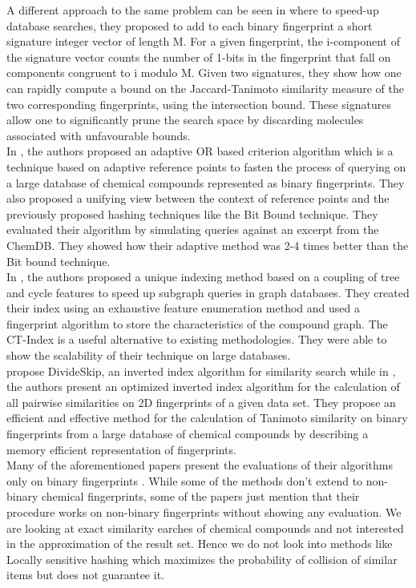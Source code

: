 A different approach to the same problem can be seen in \citet*{nasr2010hashing} where to speed-up database searches, they proposed to add to each binary fingerprint a short signature integer vector of length M. For a given fingerprint, the i-component of the signature vector counts the number of 1-bits in the fingerprint that fall on components congruent to i modulo M. Given two signatures, they show how one can rapidly compute a bound on the Jaccard-Tanimoto similarity measure of the two corresponding fingerprints, using the intersection bound. These signatures allow one to significantly prune the search space by discarding molecules associated with unfavourable bounds. \\

In \citet*{napolitano2014adaptive}, the authors proposed an adaptive OR based criterion algorithm which is a technique based on adaptive reference points to fasten the process of querying on a large database of chemical compounds represented as binary fingerprints. They also proposed a unifying view between the
context of reference points and the previously proposed hashing techniques like the Bit Bound technique. They evaluated their algorithm by simulating queries against an excerpt from the ChemDB. They showed how their adaptive method was 2-4 times better than the Bit bound technique.  \\

In \citet*{klein2011ct}, the authors proposed a unique indexing method based on a coupling of tree and cycle features to speed up subgraph queries in graph databases. They created their index using an exhaustive feature enumeration method and used a fingerprint algorithm to store the characteristics of the compound graph. The CT-Index is a useful alternative to existing methodologies. They were able to show the scalability of their technique on large databases. \\

\citet*{nasr2012speeding} propose DivideSkip, an inverted index algorithm for similarity search while in \citet*{thiel2014blocked}, the authors present an optimized inverted index algorithm for the calculation of all pairwise similarities on 2D fingerprints of a given data set. They propose an efficient and effective method for the calculation of Tanimoto similarity on binary fingerprints from a large database of chemical compounds by describing a memory efficient representation of fingerprints.\\

Many of the aforementioned papers present the evaluations of their algorithms only on binary fingerprints . While some of the methods don't extend to non-binary chemical fingerprints, some of the papers just mention that their procedure works on non-binary fingerprints without showing any evaluation. We are looking at exact similarity earches of chemical compounds and not interested in the approximation of the result set. Hence we do not look into methods like Locally sensitive hashing which maximizes the probability of collision of similar items but does not guarantee it. 

